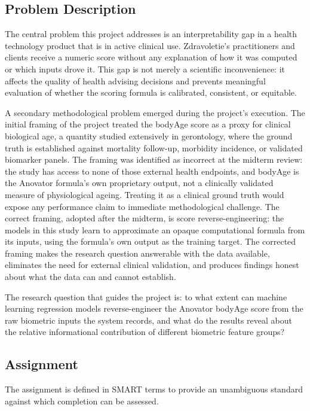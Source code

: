 \documentclass[11pt,a4paper]{article}
\begin{document}
\subsection{Problem Description}

The central problem this project addresses is an interpretability gap in a health technology product that is in active clinical use. Zdravoletie's practitioners and clients receive a numeric score without any explanation of how it was computed or which inputs drove it. This gap is not merely a scientific inconvenience: it affects the quality of health advising decisions and prevents meaningful evaluation of whether the scoring formula is calibrated, consistent, or equitable.

A secondary methodological problem emerged during the project's execution. The initial framing of the project treated the bodyAge score as a proxy for clinical biological age, a quantity studied extensively in gerontology, where the ground truth is established against mortality follow-up, morbidity incidence, or validated biomarker panels. The framing was identified as incorrect at the midterm review: the study has access to none of those external health endpoints, and bodyAge is the Anovator formula's own proprietary output, not a clinically validated measure of physiological ageing. Treating it as a clinical ground truth would expose any performance claim to immediate methodological challenge. The correct framing, adopted after the midterm, is score reverse-engineering: the models in this study learn to approximate an opaque computational formula from its inputs, using the formula's own output as the training target. The corrected framing makes the research question answerable with the data available, eliminates the need for external clinical validation, and produces findings honest about what the data can and cannot establish.

The research question that guides the project is: to what extent can machine learning regression models reverse-engineer the Anovator bodyAge score from the raw biometric inputs the system records, and what do the results reveal about the relative informational contribution of different biometric feature groups?

\subsection{Assignment}

The assignment is defined in SMART terms to provide an unambiguous standard against which completion can be assessed.
\end{document}
